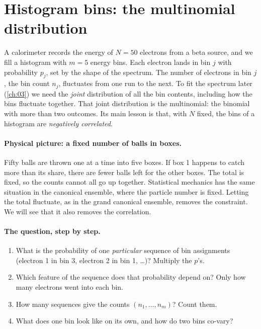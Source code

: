 \section{Histogram bins: the multinomial distribution}\label{2a:sec:multinomial}

A calorimeter records the energy of $N=50$ electrons from a beta source, and we fill a histogram with $m=5$ energy bins. Each electron lands in bin $j$ with probability $p_j$, set by the shape of the spectrum. The number of electrons in bin $j$, the bin count $n_j$, fluctuates from one run to the next. To fit the spectrum later (\cref{ch:03}) we need the \emph{joint} distribution of all the bin contents, including how the bins fluctuate together. That joint distribution is the multinomial: the binomial with more than two outcomes. Its main lesson is that, with $N$ fixed, the bins of a histogram are \emph{negatively correlated}.

\paragraph{Physical picture: a fixed number of balls in boxes.}
Fifty balls are thrown one at a time into five boxes. If box 1 happens to catch more than its share, there are fewer balls left for the other boxes. The total is fixed, so the counts cannot all go up together. Statistical mechanics has the same situation in the canonical ensemble, where the particle number is fixed. Letting the total fluctuate, as in the grand canonical ensemble, removes the constraint. We will see that it also removes the correlation.

\paragraph{The question, step by step.}
\begin{enumerate}[leftmargin=1.6em,itemsep=1pt]
  \item What is the probability of one \emph{particular} sequence of bin assignments (electron 1 in bin 3, electron 2 in bin 1, \dots)? Multiply the $p$'s.
  \item Which feature of the sequence does that probability depend on? Only how many electrons went into each bin.
  \item How many sequences give the counts $(n_1,\dots,n_m)$? Count them.
  \item What does one bin look like on its own, and how do two bins co-vary?
\end{enumerate}

